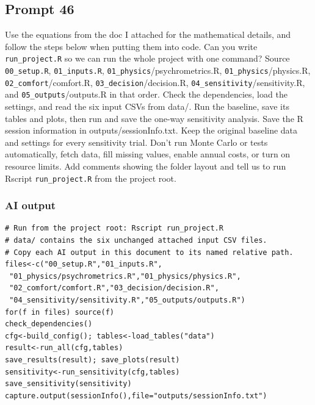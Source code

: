 \subsection*{Prompt 46}
Use the equations from the doc I attached for the mathematical details, and follow the steps below when putting them into code. Can you write \nolinkurl{run_project.R} so we can run the whole project with one command? Source \nolinkurl{00_setup.R}, \nolinkurl{01_inputs.R}, \nolinkurl{01_physics}/psychrometrics.R, \nolinkurl{01_physics}/physics.R, \nolinkurl{02_comfort}/comfort.R, \nolinkurl{03_decision}/decision.R, \nolinkurl{04_sensitivity}/sensitivity.R, and \nolinkurl{05_outputs}/outputs.R in that order.
Check the dependencies, load the settings, and read the six input CSVs from data/. Run the baseline, save its tables and plots, then run and save the one-way sensitivity analysis. Save the R session information in outputs/sessionInfo.txt.
Keep the original baseline data and settings for every sensitivity trial. Don’t run Monte Carlo or tests automatically, fetch data, fill missing values, enable annual costs, or turn on resource limits. Add comments showing the folder layout and tell us to run Rscript \nolinkurl{run_project.R} from the project root.

\subsubsection*{AI output}
\begin{lstlisting}[style=Rcode]
# Run from the project root: Rscript run_project.R
# data/ contains the six unchanged attached input CSV files.
# Copy each AI output in this document to its named relative path.
files<-c("00_setup.R","01_inputs.R",
 "01_physics/psychrometrics.R","01_physics/physics.R",
 "02_comfort/comfort.R","03_decision/decision.R",
 "04_sensitivity/sensitivity.R","05_outputs/outputs.R")
for(f in files) source(f)
check_dependencies()
cfg<-build_config(); tables<-load_tables("data")
result<-run_all(cfg,tables)
save_results(result); save_plots(result)
sensitivity<-run_sensitivity(cfg,tables)
save_sensitivity(sensitivity)
capture.output(sessionInfo(),file="outputs/sessionInfo.txt")
\end{lstlisting}

